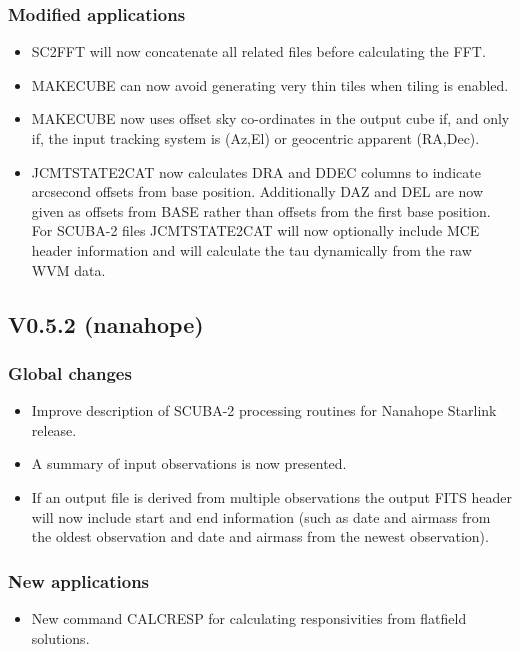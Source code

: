 \documentclass[oneside,11pt]{starlink}
\begin{document}
\subsubsection*{Modified applications}
\begin{itemize}
\item SC2FFT will now concatenate all related files before calculating the FFT.
\item MAKECUBE can now avoid generating very thin tiles when tiling is enabled.
\item MAKECUBE now uses offset sky co-ordinates in the output cube if,
  and only if, the input tracking system is (Az,El) or geocentric
  apparent (RA,Dec).
\item JCMTSTATE2CAT now calculates DRA and DDEC columns to indicate
  arcsecond offsets from base position. Additionally DAZ and DEL are
  now given as offsets from BASE rather than offsets from the first
  base position. For SCUBA-2 files JCMTSTATE2CAT will now optionally include
  MCE header information and will calculate the tau dynamically from the
  raw WVM data.
\end{itemize}

\subsection{V0.5.2 (nanahope)}

\subsubsection*{Global changes}
\begin{itemize}
\item Improve description of SCUBA-2 processing routines for Nanahope
  Starlink release.
\item A summary of input observations is now presented.
\item If an output file is derived from multiple observations the
  output FITS header will now include start and end information (such
  as date and airmass from the oldest observation and date and airmass
  from the newest observation).

\end{itemize}

\subsubsection*{New applications}
\begin{itemize}
  \item New command CALCRESP for calculating responsivities from
    flatfield solutions.
\end{itemize}
\end{document}
